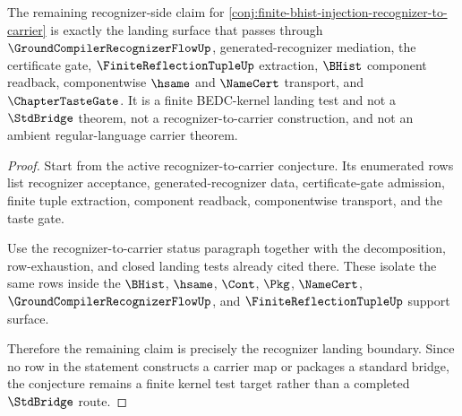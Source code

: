\begin{theorem}
\label{thm:finite-bhist-injection-open-status-sharpening}
The remaining recognizer-side claim for \autoref{conj:finite-bhist-injection-recognizer-to-carrier} is exactly the landing surface that passes through $\GroundCompilerRecognizerFlowUp$, generated-recognizer mediation, the certificate gate, $\FiniteReflectionTupleUp$ extraction, $\BHist$ component readback, componentwise $\hsame$ and $\NameCert$ transport, and $\ChapterTasteGate$. It is a finite BEDC-kernel landing test and not a $\StdBridge$ theorem, not a recognizer-to-carrier construction, and not an ambient regular-language carrier theorem.
\end{theorem}
\begin{proof}
Start from the active recognizer-to-carrier conjecture. Its enumerated rows list recognizer acceptance, generated-recognizer data, certificate-gate admission, finite tuple extraction, component readback, componentwise transport, and the taste gate.

Use the recognizer-to-carrier status paragraph together with the decomposition, row-exhaustion, and closed landing tests already cited there. These isolate the same rows inside the $\BHist$, $\hsame$, $\Cont$, $\Pkg$, $\NameCert$, $\GroundCompilerRecognizerFlowUp$, and $\FiniteReflectionTupleUp$ support surface.

Therefore the remaining claim is precisely the recognizer landing boundary. Since no row in the statement constructs a carrier map or packages a standard bridge, the conjecture remains a finite kernel test target rather than a completed $\StdBridge$ route.
\end{proof}

